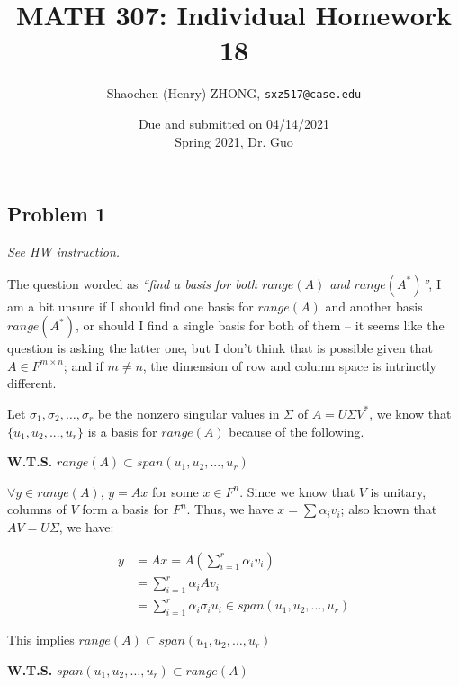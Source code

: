 \documentclass[11pt]{article}
\newcommand{\ilc}{\texttt}
\begin{document}
\title{\textbf{MATH 307: Individual Homework 18}}


\author{Shaochen (Henry) ZHONG, \ilc{sxz517@case.edu}}

\date{Due and submitted on 04/14/2021 \\ Spring 2021, Dr. Guo}
\maketitle



\subsection*{Problem 1}
\textit{See HW instruction.}\newline

The question worded as \textit{``find a basis for both $range(A)$ and $range(A^*)$''}, I am a bit unsure if I should find one basis for $range(A)$ and another basis $range(A^*)$, or should I find a single basis for both of them -- it seems like the question is asking the latter one, but I don't think that is possible given that $A \in F^{m \times n}$; and if $m \neq n$, the dimension of row and column space is intrinctly different.\newline

Let $\sigma_1, \sigma_2, \dots, \sigma_r$ be the nonzero singular values in $\Sigma$ of $A = U \Sigma V^*$, we know that $\{u_1, u_2, ..., u_r\}$ is a basis for $range(A)$ because of the following.

\textbf{W.T.S.} $range(A) \subset span(u_1, u_2, ..., u_r)$

$\forall y \in range(A)$, $y = Ax$ for some $x \in F^n$. Since we know that $V$ is unitary, columns of $V$ form a basis for $F^n$. Thus, we have $x = \sum \alpha_i v_i$; also known that $AV = U \Sigma$, we have:

\begin{align*}
    y &= Ax = A(\sum_{i=1}^r \alpha_i v_i) \\
    &= \sum_{i=1}^r \alpha_i A v_i \\
    &= \sum_{i=1}^r\alpha_i \sigma_i u_i \in span(u_1, u_2, ..., u_r)
\end{align*}

This implies $range(A) \subset span(u_1, u_2, \dots, u_r)$\newline

\textbf{W.T.S.} $span(u_1, u_2, \dots, u_r) \subset  range(A)$
\end{document}
